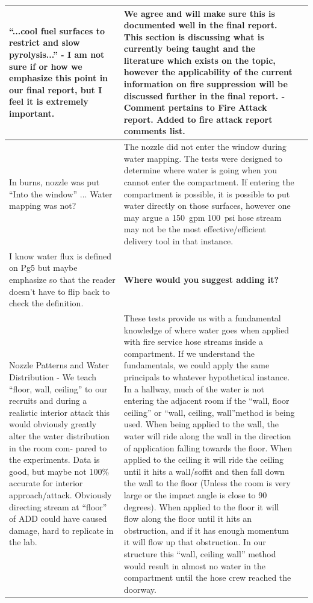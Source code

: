 \documentclass[12pt,oneside]{book}
\begin{document}
\begin{landscape}
\begin{longtable}{|L{4in}|L{3.75in}|c|}
 		\hline
 		``...cool fuel surfaces to restrict and slow pyrolysis...'' - I am not sure if or how we emphasize this point in our final report, but I feel it is extremely important. &
 		We agree and will make sure this is documented well in the final report. This section is discussing what is currently being taught and the literature which exists on the topic, however the applicability of the current information on fire suppression will be discussed further in the final report. - Comment pertains to Fire Attack report. Added to fire attack report comments list. & \\

 		\hline
 		In burns, nozzle was put ``Into the window'' ... Water mapping was not? &
 		The nozzle did not enter the window during water mapping. The tests were designed to determine where water is going when you cannot enter the compartment. If entering the compartment is possible,  it is possible to put water directly on those surfaces, however one may argue a 150~gpm 100~psi hose stream may not be the most effective/efficient delivery tool in that instance. & \\

 		\hline
 		I know water flux is defined on Pg5 but maybe emphasize so that the reader doesn't have to flip back to check the definition. &
 		\textbf{Where would you suggest adding it?} & \\

 		\hline
 		Nozzle Patterns and Water Distribution - We teach ``floor, wall, ceiling'' to our recruits and during a realistic interior attack this would obviously greatly alter the water distribution in the room com- pared to the experiments. Data is good, but maybe not 100\% accurate for interior approach/attack. Obviously directing stream at ``floor'' of ADD could have caused damage, hard to replicate in the lab. & 
 		These tests provide us with a fundamental knowledge of where water goes when applied with fire service hose streams inside a compartment. If we understand the fundamentals, we could apply the same principals to whatever hypothetical instance. In a hallway, much of the water is not entering the adjacent room if the ``wall, floor ceiling'' or ``wall, ceiling, wall''method is being used. When being applied to the wall, the water will ride along the wall in the direction of application falling towards the floor. When applied to the ceiling it will ride the ceiling until it hits a wall/soffit and then fall down the wall to the floor (Unless the room is very large or the impact angle is close to 90 degrees). When applied to the floor it will flow along the floor until it hits an obstruction, and if it has enough momentum it will flow up that obstruction. In our structure this ``wall, ceiling wall'' method would result in almost no water in the compartment until the hose crew reached the doorway. & \\


\end{longtable}
\end{landscape}
\end{document}
